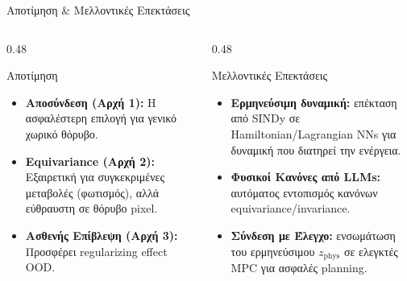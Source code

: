 \documentclass[10pt, aspectratio=169]{beamer}
\begin{document}

\begin{frame}{Αποτίμηση \& Μελλοντικές Επεκτάσεις}
    \begin{columns}[onlytextwidth, T]
        \begin{column}{0.48\textwidth}
            \begin{block}{Αποτίμηση}
                \begin{itemize}
                    \item \scriptsize \textbf{Αποσύνδεση (Αρχή 1):} Η ασφαλέστερη επιλογή για γενικό χωρικό θόρυβο.
                    \item \scriptsize \textbf{Equivariance (Αρχή 2):} Εξαιρετική για συγκεκριμένες μεταβολές (φωτισμός), αλλά εύθραυστη σε θόρυβο pixel.
                    \item \scriptsize \textbf{Ασθενής Επίβλεψη (Αρχή 3):} Προσφέρει regularizing effect OOD.
                \end{itemize}
            \end{block}
        \end{column}
        \begin{column}{0.48\textwidth}
            \begin{block}{Μελλοντικές Επεκτάσεις}
                \begin{itemize}
                    \item \scriptsize \textbf{Ερμηνεύσιμη δυναμική:} επέκταση από \textlatin{SINDy} σε \textlatin{Hamiltonian/Lagrangian NNs} για δυναμική που διατηρεί την ενέργεια.
                    \item \scriptsize \textbf{Φυσικοί Κανόνες από \textlatin{LLMs}:} αυτόματος εντοπισμός κανόνων \textlatin{equivariance/invariance}.
                    \item \scriptsize \textbf{Σύνδεση με Έλεγχο:} ενσωμάτωση του ερμηνεύσιμου $z_{\text{phys}}$ σε ελεγκτές \textlatin{MPC} για ασφαλές \textlatin{planning}.
                \end{itemize}
            \end{block}
        \end{column}
    \end{columns}
\end{frame}

\end{document}
